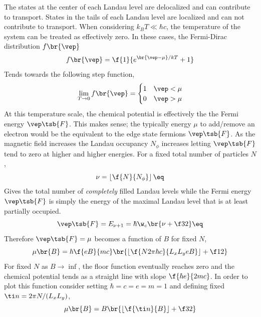 \documentclass{article}
\begin{document}
The states at the center of each Landau level are delocalized and can contribute to transport. States in the tails of each Landau level are localized and can not contribute to transport. When considering $k_B T \ll \hbar c$, the temperature of the system can be treated as effectively zero. In these cases, the Fermi-Dirac distribution $f\br{\vep}$
\[ f\br{\vep} = \f{1}{e^{\br{\vep - \mu}/kT} + 1} \]
Tends towards the following step function,
\[ \lim_{T \to 0} f\br{\vep} = \begin{cases}
    1 & \vep < \mu \\
    0 & \vep > \mu
\end{cases} \]
At this temperature scale, the chemical potential is effectively the the Fermi energy $\vep\tsb{F}$. This makes sense; the typically energy $\mu$ to add/remove an electron would be the equivalent to the edge state fermions $\vep\tsb{F}$. As the magnetic field increases the Landau occupancy $N_{\phi}$ increases letting $\vep\tsb{F}$ tend to zero at higher and higher energies. For a fixed total number of particles $N$,
\[ \nu = \left\lfloor{\f{N}{N_{\phi}}}\right\rfloor \eq \label{eq:nu}\]
Gives the total number of \textit{completely} filled Landau levels while the Fermi energy $\vep\tsb{F}$ is simply the energy of the maximal Landau level that is at least partially occupied.
\[ \vep\tsb{F} = E_{\nu + 1} = \hbar \w_c \br{\nu + \f32} \eq \label{eq:fermi} \]
Therefore $\vep\tsb{F} = \mu$ becomes a function of $B$ for fixed $N$,
\[ \mu\br{B} = \hbar \f{e B}{mc} \br{\left\lfloor{\f{N{2 \pi \hbar c}}{{L_xL_y eB}}}\right\rfloor + \f12} \]
For fixed $N$ as $B \to \inf$, the floor function eventually reaches zero and the chemical potential tends as a straight line with slope $\f{\hbar e}{2mc}$. In order to plot this function consider setting $\hbar = c = e = m = 1$ and defining fixed $\ti n = 2 \pi N / (L_xL_y)$,
\[ \mu\br{B} = B \br{\left\lfloor{\f{\ti n}{B}}\right\rfloor + \f32} \]
\begin{center}
\end{center}
\end{document}
